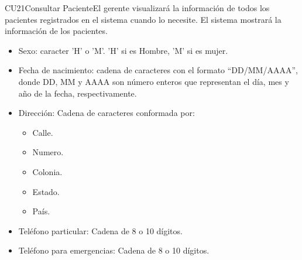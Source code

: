 \begin{UseCase}{CU21}{Consultar Paciente}{El gerente visualizará la información de todos los pacientes registrados en el sistema cuando lo necesite. El sistema mostrará la información de los pacientes.}
{\begin{itemize}
\begin{itemize}
\begin{itemize}
					\item Apellido paterno.
					\item Apellido materno.
		        \end{itemize}
		        \item Sexo: caracter 'H' o 'M'. 'H' si es Hombre, 'M' si es mujer.
		        \item Fecha de nacimiento: cadena de caracteres con el formato ``DD/MM/AAAA'', donde DD, MM y AAAA son número enteros que representan el día, mes y año de la fecha, respectivamente.
		        \item Dirección: Cadena de caracteres conformada por:
		        \begin{itemize}
		        	\item Calle.
		        	\item Numero.
		        	\item Colonia.
		        	\item Estado.
		        	\item País.
		        \end{itemize}
		        \item Teléfono particular: Cadena de 8 o 10 dígitos.
		        \item Teléfono para emergencias: Cadena de 8 o 10 dígitos.
		    \end{itemize}   
		\end{itemize}
	}
	

\end{UseCase}
